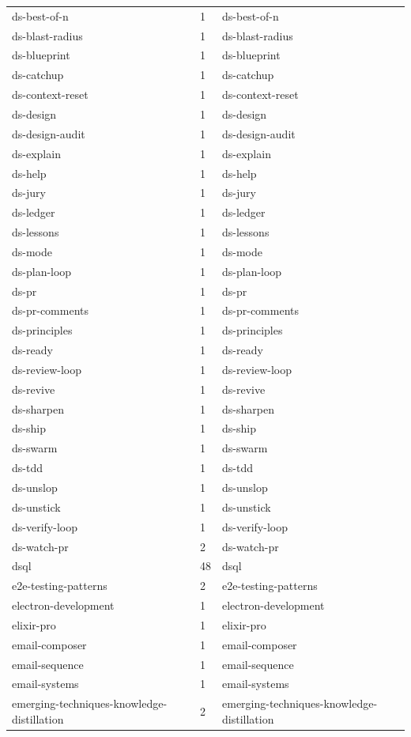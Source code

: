 \begin{longtable}{@{}lll@{}}
ds-best-of-n & 1 & ds-best-of-n\\
ds-blast-radius & 1 & ds-blast-radius\\
ds-blueprint & 1 & ds-blueprint\\
ds-catchup & 1 & ds-catchup\\
ds-context-reset & 1 & ds-context-reset\\
ds-design & 1 & ds-design\\
ds-design-audit & 1 & ds-design-audit\\
ds-explain & 1 & ds-explain\\
ds-help & 1 & ds-help\\
ds-jury & 1 & ds-jury\\
ds-ledger & 1 & ds-ledger\\
ds-lessons & 1 & ds-lessons\\
ds-mode & 1 & ds-mode\\
ds-plan-loop & 1 & ds-plan-loop\\
ds-pr & 1 & ds-pr\\
ds-pr-comments & 1 & ds-pr-comments\\
ds-principles & 1 & ds-principles\\
ds-ready & 1 & ds-ready\\
ds-review-loop & 1 & ds-review-loop\\
ds-revive & 1 & ds-revive\\
ds-sharpen & 1 & ds-sharpen\\
ds-ship & 1 & ds-ship\\
ds-swarm & 1 & ds-swarm\\
ds-tdd & 1 & ds-tdd\\
ds-unslop & 1 & ds-unslop\\
ds-unstick & 1 & ds-unstick\\
ds-verify-loop & 1 & ds-verify-loop\\
ds-watch-pr & 2 & ds-watch-pr\\
dsql & 48 & dsql\\
e2e-testing-patterns & 2 & e2e-testing-patterns\\
electron-development & 1 & electron-development\\
elixir-pro & 1 & elixir-pro\\
email-composer & 1 & email-composer\\
email-sequence & 1 & email-sequence\\
email-systems & 1 & email-systems\\
emerging-techniques-knowledge-distillation & 2 & emerging-techniques-knowledge-distillation\\

\end{longtable}
